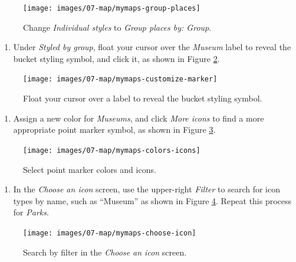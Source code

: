 \documentclass[
  english,
]{book}
\providecommand{\tightlist}{%
  \setlength{\itemsep}{0pt}\setlength{\parskip}{0pt}}
\begin{document}
\begin{figure}
\texttt{[image: images/07-map/mymaps-group-places]} \caption{Change \emph{Individual styles} to \emph{Group places by: Group}.}\label{fig:mymaps-group-places}
\end{figure}

\begin{enumerate}
\def\labelenumi{\arabic{enumi}.}
\setcounter{enumi}{9}
\tightlist
\item
  Under \emph{Styled by group}, float your cursor over the \emph{Museum} label to reveal the bucket styling symbol, and click it, as shown in Figure \ref{fig:mymaps-customize-marker}.
\end{enumerate}



\begin{figure}
\texttt{[image: images/07-map/mymaps-customize-marker]} \caption{Float your cursor over a label to reveal the bucket styling symbol.}\label{fig:mymaps-customize-marker}
\end{figure}

\begin{enumerate}
\def\labelenumi{\arabic{enumi}.}
\setcounter{enumi}{10}
\tightlist
\item
  Assign a new color for \emph{Museums}, and click \emph{More icons} to find a more appropriate point marker symbol, as shown in Figure \ref{fig:mymaps-colors-icons}.
\end{enumerate}



\begin{figure}
\texttt{[image: images/07-map/mymaps-colors-icons]} \caption{Select point marker colors and icons.}\label{fig:mymaps-colors-icons}
\end{figure}

\begin{enumerate}
\def\labelenumi{\arabic{enumi}.}
\setcounter{enumi}{11}
\tightlist
\item
  In the \emph{Choose an icon} screen, use the upper-right \emph{Filter} to search for icon types by name, such as ``Museum'' as shown in Figure \ref{fig:mymaps-choose-icon}. Repeat this process for \emph{Parks}.
\end{enumerate}



\begin{figure}
\texttt{[image: images/07-map/mymaps-choose-icon]} \caption{Search by filter in the \emph{Choose an icon} screen.}\label{fig:mymaps-choose-icon}
\end{figure}
\end{document}
